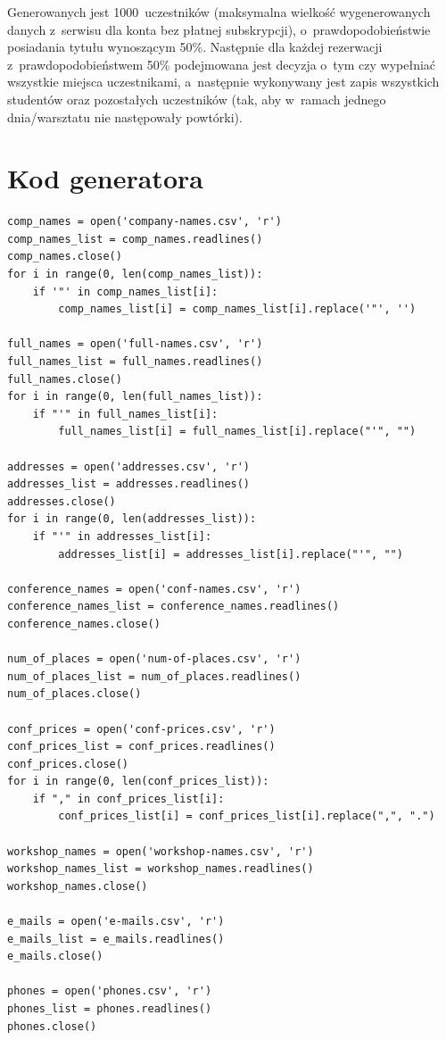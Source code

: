 \documentclass[12pt, a4paper]{mwrep}
\begin{document}
Generowanych jest 1000~uczestników (maksymalna wielkość wygenerowanych danych z~serwisu dla konta bez płatnej subskrypcji), o~prawdopodobieństwie posiadania tytułu wynoszącym 50\%. Następnie dla każdej rezerwacji z~prawdopodobieństwem 50\% podejmowana jest decyzja o~tym czy wypełniać wszystkie miejsca uczestnikami, a~następnie wykonywany jest zapis wszystkich studentów oraz pozostałych uczestników (tak, aby w~ramach jednego dnia/warsztatu nie następowały powtórki).

\lstset{style=PythonStyle}
\newpage
\section{Kod generatora}

\begin{lstlisting}
comp_names = open('company-names.csv', 'r')
comp_names_list = comp_names.readlines()
comp_names.close()
for i in range(0, len(comp_names_list)):
    if '"' in comp_names_list[i]:
        comp_names_list[i] = comp_names_list[i].replace('"', '')

full_names = open('full-names.csv', 'r')
full_names_list = full_names.readlines()
full_names.close()
for i in range(0, len(full_names_list)):
    if "'" in full_names_list[i]:
        full_names_list[i] = full_names_list[i].replace("'", "")

addresses = open('addresses.csv', 'r')
addresses_list = addresses.readlines()
addresses.close()
for i in range(0, len(addresses_list)):
    if "'" in addresses_list[i]:
        addresses_list[i] = addresses_list[i].replace("'", "")

conference_names = open('conf-names.csv', 'r')
conference_names_list = conference_names.readlines()
conference_names.close()

num_of_places = open('num-of-places.csv', 'r')
num_of_places_list = num_of_places.readlines()
num_of_places.close()

conf_prices = open('conf-prices.csv', 'r')
conf_prices_list = conf_prices.readlines()
conf_prices.close()
for i in range(0, len(conf_prices_list)):
    if "," in conf_prices_list[i]:
        conf_prices_list[i] = conf_prices_list[i].replace(",", ".")
        
workshop_names = open('workshop-names.csv', 'r')
workshop_names_list = workshop_names.readlines()
workshop_names.close()

e_mails = open('e-mails.csv', 'r')
e_mails_list = e_mails.readlines()
e_mails.close()

phones = open('phones.csv', 'r')
phones_list = phones.readlines()
phones.close()


\end{lstlisting}
\end{document}
